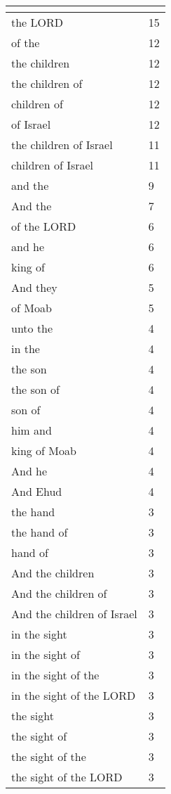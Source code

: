 \begin{center}
\begin{longtable}{|p{3.0in}|p{0.5in}|}
\hline \multicolumn{2}{c}{{ }} \\ \hline
\endfoot 
the LORD & 15\\ \hline 
of the & 12\\ \hline 
the children & 12\\ \hline 
the children of & 12\\ \hline 
children of & 12\\ \hline 
of Israel & 12\\ \hline 
the children of Israel & 11\\ \hline 
children of Israel & 11\\ \hline 
and the & 9\\ \hline 
And the & 7\\ \hline 
of the LORD & 6\\ \hline 
and he & 6\\ \hline 
king of & 6\\ \hline 
And they & 5\\ \hline 
of Moab & 5\\ \hline 
unto the & 4\\ \hline 
in the & 4\\ \hline 
the son & 4\\ \hline 
the son of & 4\\ \hline 
son of & 4\\ \hline 
him and & 4\\ \hline 
king of Moab & 4\\ \hline 
And he & 4\\ \hline 
And Ehud & 4\\ \hline 
the hand & 3\\ \hline 
the hand of & 3\\ \hline 
hand of & 3\\ \hline 
And the children & 3\\ \hline 
And the children of & 3\\ \hline 
And the children of Israel & 3\\ \hline 
in the sight & 3\\ \hline 
in the sight of & 3\\ \hline 
in the sight of the & 3\\ \hline 
in the sight of the LORD & 3\\ \hline 
the sight & 3\\ \hline 
the sight of & 3\\ \hline 
the sight of the & 3\\ \hline 
the sight of the LORD & 3\\ \hline 

\end{longtable}
\end{center}
